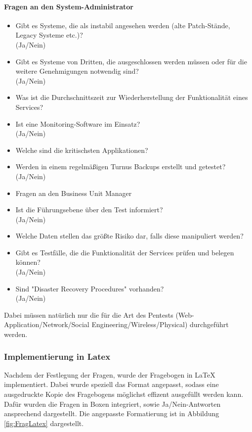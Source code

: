 \paragraph{Fragen an den System-Administrator}
\begin{itemize}
	\item Gibt es Systeme, die als instabil angesehen werden (alte Patch-Stände, Legacy Systeme etc.)?\\
	(Ja/Nein)
	\item Gibt es Systeme von Dritten, die ausgeschlossen werden müssen oder für die weitere Genehmigungen notwendig sind?\\
	(Ja/Nein)
	\item Was ist die Durchschnittszeit zur Wiederherstellung der Funktionalität eines Services?
	\item Ist eine Monitoring-Software im Einsatz?\\
	(Ja/Nein)
	\item Welche sind die kritischsten Applikationen?
	\item Werden in einem regelmäßigen Turnus Backups erstellt und getestet?\\
	(Ja/Nein)
	\item Fragen an den Business Unit Manager
	\item Ist die Führungsebene über den Test informiert?\\
	(Ja/Nein)
	\item Welche Daten stellen das größte Risiko dar, falls diese manipuliert werden?
	\item Gibt es Testfälle, die die Funktionalität der Services prüfen und belegen können?\\
	(Ja/Nein)
	\item Sind "Disaster Recovery Procedures" vorhanden?\\
	(Ja/Nein)
\end{itemize}

Dabei müssen natürlich nur die für die Art des Pentests (Web-Application/Network/Social Engineering/Wireless/Physical) durchgeführt werden.

\subsubsection{Implementierung in Latex}\label{ref:AufImplInTex}
Nachdem der Festlegung der Fragen, wurde der Fragebogen in LaTeX implementiert. Dabei wurde speziell das Format angepasst, sodass eine ausgedruckte Kopie des Fragebogens möglichst effizent ausgefüllt werden kann. Dafür wurden die Fragen in Boxen integriert, sowie Ja/Nein-Antworten ansprechend dargestellt. Die angepasste Formatierung ist in Abbildung \ref{fig:FragLatex} dargestellt.\\


